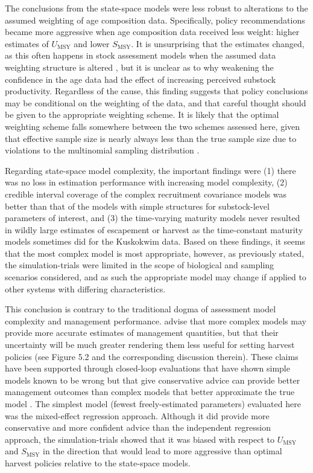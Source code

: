 \documentclass[12pt,]{book}
\theoremstyle{definition}
\theoremstyle{definition}
\theoremstyle{definition}
\theoremstyle{remark}
\begin{document}
The conclusions from the state-space models were less robust to
alterations to the assumed weighting of age composition data.
Specifically, policy recommendations became more aggressive when age
composition data received less weight: higher estimates of
\(U_{\text{MSY}}\) and lower \(S_{\text{MSY}}\). It is unsurprising that
the estimates changed, as this often happens in stock assessment models
when the assumed data weighting structure is altered
\citep{hulson-etal-2011}, but it is unclear as to why weakening the
confidence in the age data had the effect of increasing perceived
substock productivity. Regardless of the cause, this finding suggests
that policy conclusions may be conditional on the weighting of the data,
and that careful thought should be given to the appropriate weighting
scheme. It is likely that the optimal weighting scheme falls somewhere
between the two schemes assessed here, given that effective sample size
is nearly always less than the true sample size due to violations to the
multinomial sampling distribution \citep[e.g., sampled individuals show
similarities that result in clustering, non-independence, and
overdispersion;][]{maunder-2011}.

Regarding state-space model complexity, the important findings were (1)
there was no loss in estimation performance with increasing model
complexity, (2) credible interval coverage of the complex recruitment
covariance models was better than that of the models with simple
structures for substock-level parameters of interest, and (3) the
time-varying maturity models never resulted in wildly large estimates of
escapement or harvest as the time-constant maturity models sometimes did
for the Kuskokwim data. Based on these findings, it seems that the most
complex model is most appropriate, however, as previously stated, the
simulation-trials were limited in the scope of biological and sampling
scenarios considered, and as such the appropriate model may change if
applied to other systems with differing characteristics.

This conclusion is contrary to the traditional dogma of assessment model
complexity and management performance. \citet{walters-martell-2004}
advise that more complex models may provide more accurate estimates of
management quantities, but that their uncertainty will be much greater
rendering them less useful for setting harvest policies (see Figure 5.2
and the corresponding discussion therein). These claims have been
supported through closed-loop evaluations that have shown simple models
known to be wrong but that give conservative advice can provide better
management outcomes than complex models that better approximate the true
model \citep[e.g.,][]{hilborn-1979, ludwig-walters-1985}. The simplest
model (fewest freely-estimated parameters) evaluated here was the
mixed-effect regression approach. Although it did provide more
conservative and more confident advice than the independent regression
approach, the simulation-trials showed that it was biased with respect
to \(U_{\text{MSY}}\) and \(S_{\text{MSY}}\) in the direction that would
lead to more aggressive than optimal harvest policies relative to the
state-space models.
\end{document}
